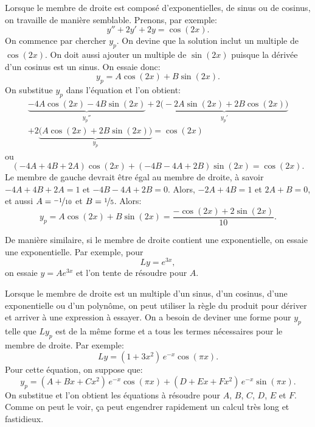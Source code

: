 \medskip

Lorsque le membre de droite est composé d'exponentielles, de sinus ou de cosinus, on travaille de manière semblable. Prenons, par exemple: 
\begin{equation*}
	y''+2y'+2y = \cos (2x) .
\end{equation*}
On commence par chercher $y_p$.  On devine que la solution inclut un multiple de  $\cos(2x)$.
On doit aussi ajouter un multiple de $\sin (2x)$ puisque la dérivée d'un cosinus est un sinus. On essaie donc: 
\begin{equation*}
	y_p = A \cos (2x) + B \sin (2x) .
\end{equation*}
On substitue  $y_p$ dans l'équation et l'on obtient: 
\begin{multline*}
	\underbrace{-4 A \cos (2x) - 4 B \sin (2x)}_{y_p''}
		+2 \underbrace{\bigl(-2A \sin (2x) + 2B \cos (2x)\bigr)}_{y_p'}	\\
		+2 \underbrace{\bigl(A \cos (2x) + 2B \sin (2x)\bigr)}_{y_p}
	= \cos (2x) 
\end{multline*}
ou
\begin{equation*}
	(-4A+4B+2A) \cos(2x) +	(-4B-4A+2B) \sin(2x) 	= \cos(2x) .
\end{equation*}
Le membre de gauche devrait être égal au membre de droite, à savoir 
$-4A + 4B + 2A = 1$ et $-4B - 4A + 2B = 0$.  
Alors, $-2A+4B =1$ et $2A+B=0$, et aussi   $A=\nicefrac{-1}{10}$ et $B=\nicefrac{1}{5}$.  
Alors: 
\begin{equation*}
y_p = A \cos (2x) + B \sin (2x) = \frac{-\cos (2x) + 2 \sin (2x)}{10} .
\end{equation*}

De manière similaire, si le membre de droite contient une exponentielle, on essaie une exponentielle. Par exemple, pour 
\begin{equation*}
Ly = e^{3x},
\end{equation*}
on essaie $y = A e^{3x}$ et l'on tente de résoudre pour $A$.

\medskip

Lorsque le membre de droite est un multiple d'un sinus, d'un cosinus, d'une exponentielle ou d'un polynôme, on peut utiliser la règle du produit pour dériver et arriver à une expression à essayer. On a besoin de deviner une forme pour $y_p$ telle que $Ly_p$ est de la même forme et a tous les termes nécessaires pour le membre de droite. Par exemple: 
\begin{equation*}
	Ly = (1+3x^2)\,e^{-x}\cos (\pi x) .
\end{equation*}
Pour cette équation, on suppose que: 
\begin{equation*}
	y_p = (A + Bx + Cx^2)\,e^{-x} \cos (\pi x) + (D + Ex + Fx^2)\,e^{-x} \sin (\pi x) .
\end{equation*}
On substitue et l'on obtient les équations à résoudre pour 
$A$, $B$, $C$, $D$, $E$ et $F$.
Comme on peut le voir, ça peut engendrer rapidement un calcul très long et fastidieux.  

